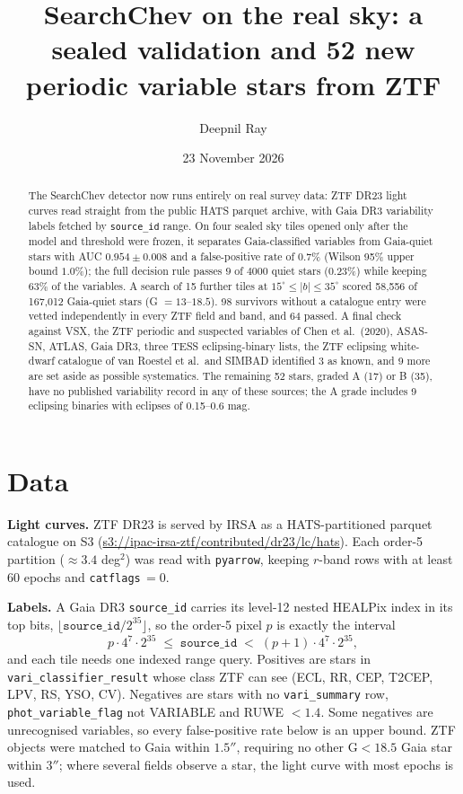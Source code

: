 \documentclass[11pt]{article}
\title{SearchChev on the real sky: a sealed validation and 52 new\\ periodic variable stars from ZTF}
\author{Deepnil Ray}
\date{23 November 2026}
\begin{document}
\maketitle
\begin{abstract}
The SearchChev detector now runs entirely on real survey data: ZTF DR23 light curves read straight from the public HATS parquet archive, with Gaia DR3 variability labels fetched by \texttt{source\_id} range. On four sealed sky tiles opened only after the model and threshold were frozen, it separates Gaia-classified variables from Gaia-quiet stars with AUC $0.954\pm0.008$ and a false-positive rate of $0.7\%$ (Wilson 95\% upper bound $1.0\%$); the full decision rule passes $9$ of $4000$ quiet stars ($0.23\%$) while keeping $63\%$ of the variables. A search of 15 further tiles at $15^\circ\le|b|\le35^\circ$ scored 58{,}556 of 167{,}012 Gaia-quiet stars (G $=13$--$18.5$). 98 survivors without a catalogue entry were vetted independently in every ZTF field and band, and 64 passed. A final check against VSX, the ZTF periodic and suspected variables of Chen et al.\ (2020), ASAS-SN, ATLAS, Gaia DR3, three TESS eclipsing-binary lists, the ZTF eclipsing white-dwarf catalogue of van Roestel et al.\ and SIMBAD identified 3 as known, and 9 more are set aside as possible systematics. The remaining 52 stars, graded A (17) or B (35), have no published variability record in any of these sources; the A grade includes 9 eclipsing binaries with eclipses of 0.15--0.6 mag.
\end{abstract}

\section{Data}
\textbf{Light curves.} ZTF DR23 is served by IRSA as a HATS-partitioned parquet catalogue on S3 (\url{s3://ipac-irsa-ztf/contributed/dr23/lc/hats}). Each order-5 partition ($\approx3.4$ deg$^2$) was read with \texttt{pyarrow}, keeping $r$-band rows with at least 60 epochs and \texttt{catflags}$\,=0$.

\textbf{Labels.} A Gaia DR3 \texttt{source\_id} carries its level-12 nested HEALPix index in its top bits, $\lfloor \texttt{source\_id}/2^{35}\rfloor$, so the order-5 pixel $p$ is exactly the interval
\[
p\cdot4^{7}\cdot2^{35}\;\le\;\texttt{source\_id}\;<\;(p+1)\cdot4^{7}\cdot2^{35},
\]
and each tile needs one indexed range query. Positives are stars in \texttt{vari\_classifier\_result} whose class ZTF can see (ECL, RR, CEP, T2CEP, LPV, RS, YSO, CV). Negatives are stars with no \texttt{vari\_summary} row, \texttt{phot\_variable\_flag} not VARIABLE and RUWE $<1.4$. Some negatives are unrecognised variables, so every false-positive rate below is an upper bound. ZTF objects were matched to Gaia within $1.5''$, requiring no other G$<18.5$ Gaia star within $3''$; where several fields observe a star, the light curve with most epochs is used.
\end{document}
